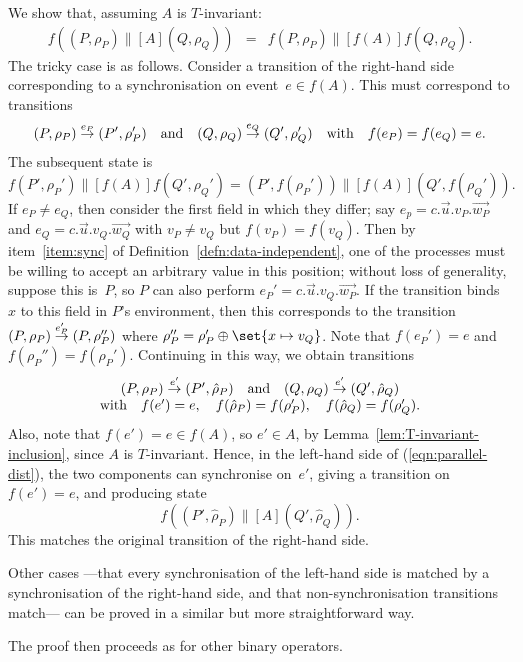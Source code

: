 We show that, assuming $A$ is $T$-invariant:
%
\begin{eqnarray}
\label{eqn:parallel-dist}
f((P,\rho_P) \parallel[A] (Q,\rho_Q)) & = & 
  f(P,\rho_P) \parallel[f(A)] f(Q,\rho_Q).
\end{eqnarray}
%
The tricky case is as follows.  Consider a transition of the right-hand side
corresponding to a synchronisation on event~$e \in f(A)$.  This must
correspond to transitions 
\[
(P,\rho_P) \stackrel{e_P}{\rightarrow} (P',\rho_P') \quad\mbox{and}\quad
(Q,\rho_Q) \stackrel{e_Q}{\rightarrow} (Q',\rho_Q') \quad
\mbox{with}\quad f(e_P) = f(e_Q) = e.
\]
The subsequent state is 
\[
f(P',\rho_P') \parallel[f(A)] f(Q',\rho_Q') = 
  (P',f(\rho_P')) \parallel[f(A)] (Q',f(\rho_Q')).
\]
If $e_P \ne e_Q$, then consider the first field in which they differ; say $e_p
= c.\vec{u}.v_P.\vec{w_P}$ and $e_Q = c.\vec{u}.v_Q.\vec{w_Q}$ with $v_P \ne
v_Q$ but $f(v_P) = f(v_Q)$.
%
Then by item~\ref{item:sync} of Definition~\ref{defn:data-independent}, one of
the processes must be willing to accept an arbitrary value in this position;
without loss of generality, suppose this is~$P$, so $P$ can also perform $e_P'
= c.\vec{u}.v_Q.\vec{w_P}$.  If the transition binds $x$ to this field in
$P$'s environment, then this corresponds to the transition
$(P,\rho_P) \stackrel{e_P'}{\rightarrow} (P,\rho_P'')$ where $\rho_P''
= \rho_P' \oplus \set{x \mapsto v_Q}$.  Note that $f(e_P') = e$ and
$f(\rho_P'') = f(\rho_P')$.
%
Continuing in this way, we obtain transitions
\[
\begin{array}{c}
(P,\rho_P) \stackrel{e'}{\rightarrow} (P',\hat\rho_P) \quad\mbox{and}\quad
(Q,\rho_Q) \stackrel{e'}{\rightarrow} (Q',\hat\rho_Q) \\
\mbox{with}\quad f(e')  = e, \quad 
f(\hat\rho_P) = f(\rho_P'), \quad f(\hat\rho_Q) = f(\rho_Q').
\end{array}
\]
Also, note that $f(e') = e \in f(A)$, so $e' \in A$, by
Lemma~\ref{lem:T-invariant-inclusion}, since $A$ is $T$-invariant.
%
Hence, in the left-hand side of (\ref{eqn:parallel-dist}), the two
components can synchronise on~$e'$, giving a transition on $f(e') = e$, and
producing state 
\[
f( (P',\hat\rho_P) \parallel[A] (Q',\hat\rho_Q) ) .
\]
This matches the original transition of the right-hand side.

Other cases ---that every synchronisation of the left-hand side is matched by
a synchronisation of the right-hand side, and that non-synchronisation
transitions match--- can be proved in a similar but more straightforward way.

The proof then proceeds as for other binary operators.  

